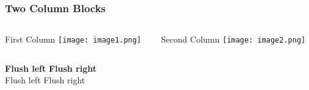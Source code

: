 \begin{frame}
  \frametitle{Two Column Blocks}
  \begin{columns}
    \begin{column}{0.5\textwidth}
      \begin{block}{First Column}
        \texttt{[image: image1.png]}
      \end{block}
    \end{column}
    \begin{column}{0.5\textwidth}
      \begin{block}{Second Column}
        \texttt{[image: image2.png]}
      \end{block}
    \end{column}
  \end{columns}
  \vfill
  \textbf{Flush left} \hfill \textbf{Flush right} \\
  Flush left \hfill Flush right
\end{frame}
